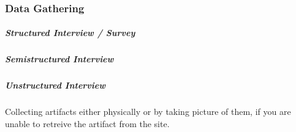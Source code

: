 \subsubsection{Data Gathering}
\label{sec:1_data_gathering}

\begin{method}[Interview] \label{meth:interview} 

  
\end{method}

\subparagraph{Structured Interview / Survey}  


\subparagraph{Semistructured Interview} 


\subparagraph{Unstructured Interview} 


\begin{method}[Observation] \label{meth:observation} 
  
\end{method}

\begin{method} \label{meth:contextual_interview} 
  
\end{method}

\begin{definition}[Artifact] \label{def:artifact} 
  
\end{definition}

\begin{method} \label{meth:artifact_collection} 
  Collecting artifacts either physically or by taking picture of them, if you are unable to retreive the artifact from the site.
\end{method}